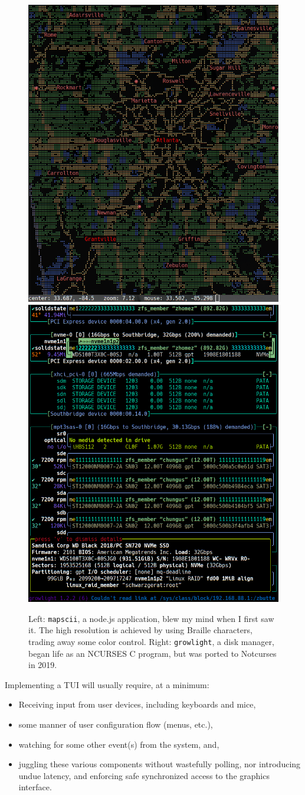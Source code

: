 \documentclass[letterpaper,10pt]{article}
\newenvironment{denseitemize}{
  \begin{itemize}
      \setlength{\itemsep}{0pt}
}{
  \end{itemize}
}
\begin{document}
\begin{figure}[!htb] \centering
    \includegraphics[width=.4\linewidth]{media/tui-mapscii.png}
    \hfill
    \includegraphics[width=.4\linewidth]{media/tui-growlight.png}
    \caption[Non-NCURSES TUIs: Mapscii and Growlight.]{Left: \texttt{mapscii}, a
    node.js application, blew my mind when I first saw it. The high resolution
    is achieved by using Braille characters, trading away some color control.
    Right: \texttt{growlight}, a disk manager, began life as an NCURSES C
    program, but was ported to Notcurses in 2019.}
  \label{fig:notncurses-tuis}
\end{figure}

Implementing a TUI will usually require, at a minimum:
\begin{denseitemize}
\item{Receiving input from user devices, including keyboards and mice,}
\item{some manner of user configuration flow (menus, etc.),}
\item{watching for some other event(s) from the system, and},
\item{juggling these various components without wastefully polling, nor
       introducing undue latency, and enforcing safe synchronized access to
       the graphics interface.}
\end{denseitemize}
\end{document}
